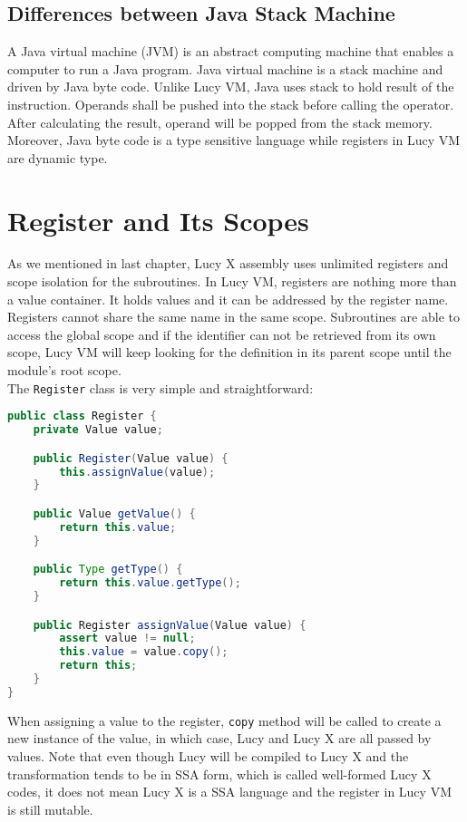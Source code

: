 \subsection{Differences between Java Stack Machine}
A Java virtual machine (JVM) is an abstract computing machine that enables a computer to run a Java program. Java virtual machine is a stack machine and driven by Java byte code. Unlike Lucy VM, Java uses stack to hold result of the instruction. Operands shall be pushed into the stack before calling the operator. After calculating the result, operand will be popped from the stack memory. Moreover, Java byte code is a type sensitive language while registers in Lucy VM are dynamic type.


\section{Register and Its Scopes}
As we mentioned in last chapter, Lucy X assembly uses unlimited registers and scope isolation for the subroutines. In Lucy VM, registers are nothing more than a value container. It holds values and it can be addressed by the register name. Registers cannot share the same name in the same scope. Subroutines are able to access the global scope and if the identifier can not be retrieved from its own scope, Lucy VM will keep looking for the definition in its parent scope until the module’s root scope. \\
The \texttt{Register} class is very simple and straightforward:
\begin{lstlisting}[language=java]
public class Register {
    private Value value;

    public Register(Value value) {
        this.assignValue(value);
    }

    public Value getValue() {
        return this.value;
    }

    public Type getType() {
        return this.value.getType();
    }

    public Register assignValue(Value value) {
        assert value != null;
        this.value = value.copy();
        return this;
    }
}
\end{lstlisting}
When assigning a value to the register, \texttt{copy} method will be called to create a new instance of the value, in which case, Lucy and Lucy X are all passed by values. Note that even though Lucy will be compiled to Lucy X and the transformation tends to be in SSA form, which is called well-formed Lucy X codes, it does not mean Lucy X is a SSA language and the register in Lucy VM is still mutable. \\
